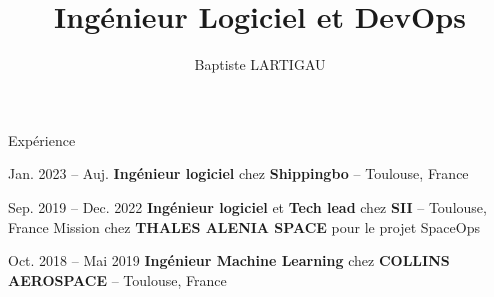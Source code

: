 \documentclass[a4paper, 10pt]{article}
\author{Baptiste LARTIGAU}
\title{Ingénieur Logiciel et DevOps}
\begin{document}
\thispagestyle{empty}
\maketitle



\section{\faBlackTie}{Expérience}

\begin{datedEntry}
    {Jan. 2023 -- Auj.}
    {\textbf{Ingénieur logiciel} chez \textbf{Shippingbo} -- Toulouse, France}
\end{datedEntry}

\begin{datedEntry}
    {Sep. 2019 -- Dec. 2022}
    {\textbf{Ingénieur logiciel} et \textbf{Tech lead} chez \textbf{SII} -- Toulouse, France}
    Mission chez \textbf{THALES ALENIA SPACE} pour le projet SpaceOps

    \smallskip
\end{datedEntry}

\begin{datedEntry}
    {Oct. 2018 -- Mai 2019}
    {\textbf{Ingénieur Machine Learning} chez \textbf{COLLINS AEROSPACE} -- Toulouse, France}
\end{datedEntry}

\iffalse
\begin{datedEntry}
    {Juil. -- Oct. 2018}
    {\textbf{Ingénieur sécurité cloud AWS} chez \textbf{AIRBUS} -- Toulouse, France}
    \entryItem{Application du \textbf{AWS Well Architected Framework} aux infrastructures d’Airbus}
    \entryItem{Définition de règles de sécurité et de standards dans l’entreprise pour les services AWS}
\end{datedEntry}
\fi
\end{document}

